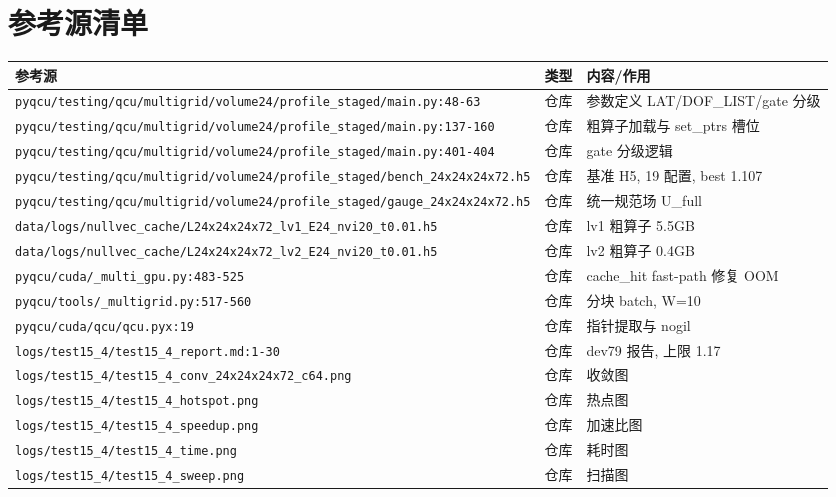 \documentclass[UTF8]{ctexart}
\begin{document}
\section{参考源清单}
\begin{xltabular}{\textwidth}{llX}
\toprule
\textcolor{evidence}{参考源} & 类型 & 内容/作用 \\
\midrule
\endhead
\texttt{\nolinkurl{pyqcu/testing/qcu/multigrid/volume24/profile_staged/main.py:48-63}} & 仓库 & 参数定义 LAT/DOF\_LIST/gate 分级 \\
\texttt{\nolinkurl{pyqcu/testing/qcu/multigrid/volume24/profile_staged/main.py:137-160}} & 仓库 & 粗算子加载与 set\_ptrs 槽位 \\
\texttt{\nolinkurl{pyqcu/testing/qcu/multigrid/volume24/profile_staged/main.py:401-404}} & 仓库 & gate 分级逻辑 \\
\texttt{\nolinkurl{pyqcu/testing/qcu/multigrid/volume24/profile_staged/bench_24x24x24x72.h5}} & 仓库 & 基准 H5, 19 配置, best 1.107 \\
\texttt{\nolinkurl{pyqcu/testing/qcu/multigrid/volume24/profile_staged/gauge_24x24x24x72.h5}} & 仓库 & 统一规范场 U\_full \\
\texttt{\nolinkurl{data/logs/nullvec_cache/L24x24x24x72_lv1_E24_nvi20_t0.01.h5}} & 仓库 & lv1 粗算子 5.5GB \\
\texttt{\nolinkurl{data/logs/nullvec_cache/L24x24x24x72_lv2_E24_nvi20_t0.01.h5}} & 仓库 & lv2 粗算子 0.4GB \\
\texttt{\nolinkurl{pyqcu/cuda/_multi_gpu.py:483-525}} & 仓库 & cache\_hit fast-path 修复 OOM \\
\texttt{\nolinkurl{pyqcu/tools/_multigrid.py:517-560}} & 仓库 & 分块 batch, W=10 \\
\texttt{\nolinkurl{pyqcu/cuda/qcu/qcu.pyx:19}} & 仓库 & 指针提取与 nogil \\
\texttt{\nolinkurl{logs/test15_4/test15_4_report.md:1-30}} & 仓库 & dev79 报告, 上限 1.17 \\
\texttt{\nolinkurl{logs/test15_4/test15_4_conv_24x24x24x72_c64.png}} & 仓库 & 收敛图 \\
\texttt{\nolinkurl{logs/test15_4/test15_4_hotspot.png}} & 仓库 & 热点图 \\
\texttt{\nolinkurl{logs/test15_4/test15_4_speedup.png}} & 仓库 & 加速比图 \\
\texttt{\nolinkurl{logs/test15_4/test15_4_time.png}} & 仓库 & 耗时图 \\
\texttt{\nolinkurl{logs/test15_4/test15_4_sweep.png}} & 仓库 & 扫描图 \\

\end{xltabular}
\end{document}
